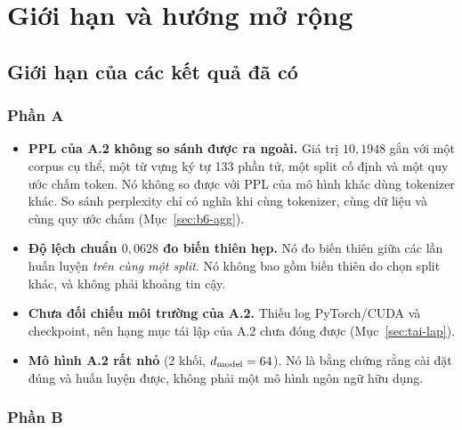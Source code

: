\section{Giới hạn và hướng mở rộng}
\label{sec:gioi-han}

\subsection{Giới hạn của các kết quả đã có}

\subsubsection{Phần A}

\begin{itemize}[leftmargin=2em]
\item \textbf{PPL của A.2 không so sánh được ra ngoài.} Giá trị $10{,}1948$ gắn với
một corpus cụ thể, một từ vựng ký tự 133 phần tử, một split cố định và một quy ước
chấm token. Nó không so được với PPL của mô hình khác dùng tokenizer khác. So sánh
perplexity chỉ có nghĩa khi cùng tokenizer, cùng dữ liệu và cùng quy ước chấm
(Mục~\ref{sec:b6-agg}).
\item \textbf{Độ lệch chuẩn $0{,}0628$ đo biến thiên hẹp.} Nó đo biến thiên giữa
các lần huấn luyện \emph{trên cùng một split}. Nó không bao gồm biến thiên do chọn
split khác, và không phải khoảng tin cậy.
\item \textbf{Chưa đối chiếu môi trường của A.2.} Thiếu log PyTorch/CUDA và
checkpoint, nên hạng mục tái lập của A.2 chưa đóng được
(Mục~\ref{sec:tai-lap}).
\item \textbf{Mô hình A.2 rất nhỏ} (2 khối, $d_{\mathrm{model}}=64$). Nó là bằng chứng rằng
cài đặt đúng và huấn luyện được, không phải một mô hình ngôn ngữ hữu dụng.
\end{itemize}

\subsubsection{Phần B}


